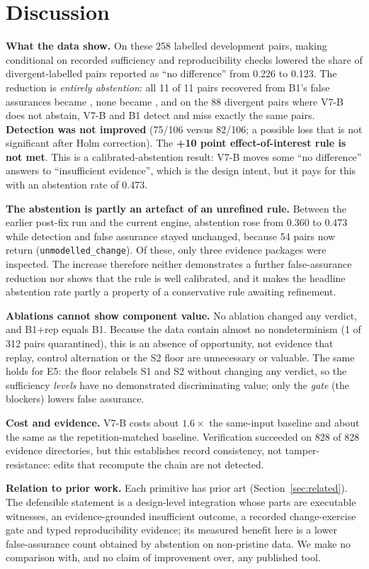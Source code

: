 \section{Discussion}\label{sec:discussion}
\textbf{What the data show.} On these 258 labelled development pairs, making \NDO{} conditional on recorded sufficiency and reproducibility checks lowered the share of divergent-labelled pairs reported as ``no difference'' from 0.226 to 0.123. The reduction is \emph{entirely abstention}: all 11 of 11 pairs recovered from B1's false assurances became \INS{}, none became \DIV{}, and on the 88 divergent pairs where V7-B does not abstain, V7-B and B1 detect and miss exactly the same pairs. \textbf{Detection was not improved} (75/106 versus 82/106; a possible loss that is not significant after Holm correction). The \textbf{+10 point effect-of-interest rule is not met}. This is a calibrated-abstention result: V7-B moves some ``no difference'' answers to ``insufficient evidence'', which is the design intent, but it pays for this with an abstention rate of 0.473.

\textbf{The abstention is partly an artefact of an unrefined rule.} Between the earlier post-fix run and the current engine, abstention rose from 0.360 to 0.473 while detection and false assurance stayed unchanged, because 54 pairs now return \INS{}(\texttt{unmodelled\_change}). Of these, only three evidence packages were inspected. The increase therefore neither demonstrates a further false-assurance reduction nor shows that the rule is well calibrated, and it makes the headline abstention rate partly a property of a conservative rule awaiting refinement.

\textbf{Ablations cannot show component value.} No ablation changed any verdict, and B1+rep equals B1. Because the data contain almost no nondeterminism (1 of 312 pairs quarantined), this is an absence of opportunity, not evidence that replay, control alternation or the S2 floor are unnecessary or valuable. The same holds for E5: the floor relabels S1 and S2 without changing any verdict, so the sufficiency \emph{levels} have no demonstrated discriminating value; only the \emph{gate} (the blockers) lowers false assurance.

\textbf{Cost and evidence.} V7-B costs about $1.6\times$ the same-input baseline and about the same as the repetition-matched baseline. Verification succeeded on 828 of 828 evidence directories, but this establishes record consistency, not tamper-resistance: edits that recompute the chain are not detected.

\textbf{Relation to prior work.} Each primitive has prior art (Section~\ref{sec:related}). The defensible statement is a design-level integration whose parts are executable witnesses, an evidence-grounded insufficient outcome, a recorded change-exercise gate and typed reproducibility evidence; its measured benefit here is a lower false-assurance count obtained by abstention on non-pristine data. We make no comparison with, and no claim of improvement over, any published tool.
